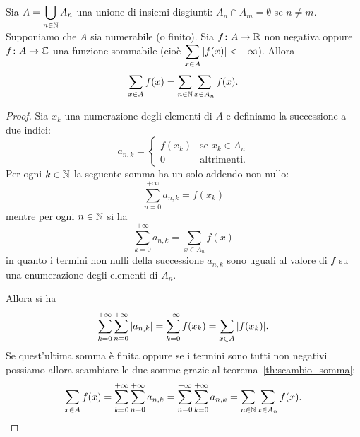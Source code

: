 \begin{theorem}
  Sia $A = \displaystyle\bigcup_{n\in {\mathbb N}} A_n$ una unione di insiemi 
  disgiunti: $A_n\cap A_m=\emptyset$ se $n\neq m$.
  Supponiamo che $A$ sia numerabile (o finito).
  Sia $f\colon A \to {\mathbb R}$ non negativa oppure $f\colon A \to {\mathbb C}$ 
  una funzione sommabile (cioè $\displaystyle\sum_{x\in A}{\left|f(x)\right|}< +\infty$).
  Allora 
  \[
    \sum_{x\in A}f(x) = \sum_{n\in {\mathbb N}} \sum_{x\in A_n} f(x).  
  \]
\end{theorem}
%
\begin{proof}
Sia $x_k$ una numerazione degli elementi di $A$ e definiamo 
la successione a due indici:
\[
  a_{n,k} = \begin{cases}
    f(x_k) & \text{se $x_k\in A_n$}\\
    0 & \text{altrimenti.}
  \end{cases}  
\]
Per ogni $k\in {\mathbb N}$ la seguente somma 
ha un solo addendo non nullo:
\[
 \sum_{n=0}^{+\infty}  a_{n,k} = f(x_k)
\]
mentre per ogni $n\in {\mathbb N}$ si ha 
\[
 \sum_{k=0}^{+\infty} a_{n,k} = \sum_{x\in A_n} f(x)  
\]
in quanto i termini non nulli della successione 
$a_{n,k}$ sono uguali al valore di $f$ su una enumerazione 
degli elementi di $A_n$.

Allora si ha
\[
 \sum_{k=0}^{+\infty}\sum_{n=0}^{+\infty} {\left|a_{n,k}\right|}
 = \sum_{k=0}^{+\infty} {f(x_k)} = \sum_{x\in A} {\left|f(x_k)\right|}.
\]
Se quest'ultima somma è finita oppure se i termini sono tutti non negativi
possiamo allora scambiare le due somme grazie al teorema~\ref{th:scambio_somma}:
\[
  \sum_{x\in A} f(x) 
  = \sum_{k=0}^{+\infty} \sum_{n=0}^{+\infty} a_{n,k}
  = \sum_{n=0}^{+\infty} \sum_{k=0}^{+\infty} a_{n,k}
  = \sum_{n\in {\mathbb N}} \sum_{x\in A_n}f(x).  
\]
\end{proof}


